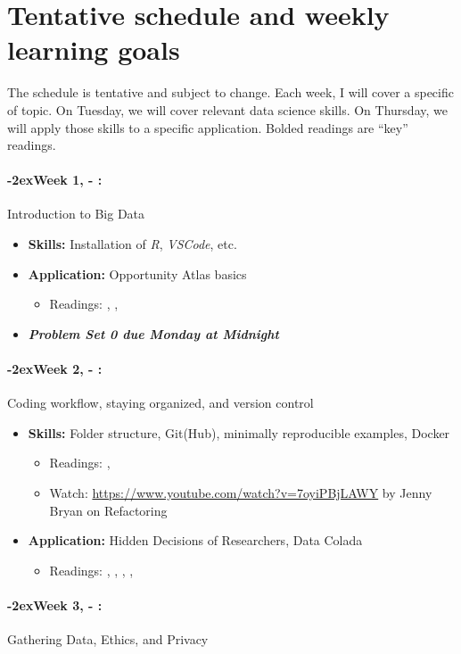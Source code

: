 \documentclass[11pt]{article}
\newcommand{\week}[1]{%
  \paragraph*{\kern-2ex\quad #1, \AdvanceDate[1]\syldate{\today} - \AdvanceDate[2]\syldate{\today}:}%
  \ifdim\wd1=\wd\MONDAY
    \AdvanceDate[7]
  \else
    \AdvanceDate[7]
  \fi%
}
\begin{document}

\newpage
\section*{Tentative schedule and weekly learning goals}
\label{sec:sched}
The schedule is tentative and subject to change. Each week, I will cover a specific of topic. On Tuesday, we will cover relevant data science skills. On Thursday, we will apply those skills to a specific application. Bolded readings are ``key'' readings.

\normalsize

\SetDate[01/01/2024]
\week{Week 1} Introduction to Big Data
\begin{itemize}
  \item \textbf{Skills:} Installation of \textit{R}, \textit{VSCode}, etc.
  \item \textbf{Application:} Opportunity Atlas basics
  \begin{itemize}
    \item Readings: \textbf{\cite{chetty2018opportunityatlas}}, \cite{chetty2020opportunity}, \cite{einav2014ageofbigdata}
  \end{itemize}
  \item \textit{\textbf{Problem Set 0 due Monday at Midnight}}
\end{itemize}
\week{Week 2} Coding workflow, staying organized, and version control
\begin{itemize}
  \item \textbf{Skills:} Folder structure, Git(Hub), minimally reproducible examples, Docker
  \begin{itemize}
    \item Readings: \textbf{\cite{gentzkowshapiro2014code}}, \cite{mcdermott2022docker}
    \item Watch: \url{https://www.youtube.com/watch?v=7oyiPBjLAWY} by Jenny Bryan on Refactoring
  \end{itemize}
  \item \textbf{Application:} Hidden Decisions of Researchers, Data Colada
  \begin{itemize}
    \item Readings: \textbf{\cite{huntingtonklen2021influence}}, \cite{tinyverse}, \cite{wickhamtidy}, \cite{datacolada2021groundhog}, \cite{datacolada2022groundhog}
  \end{itemize}
\end{itemize}
\week{Week 3} Gathering Data, Ethics, and Privacy
\end{document}
